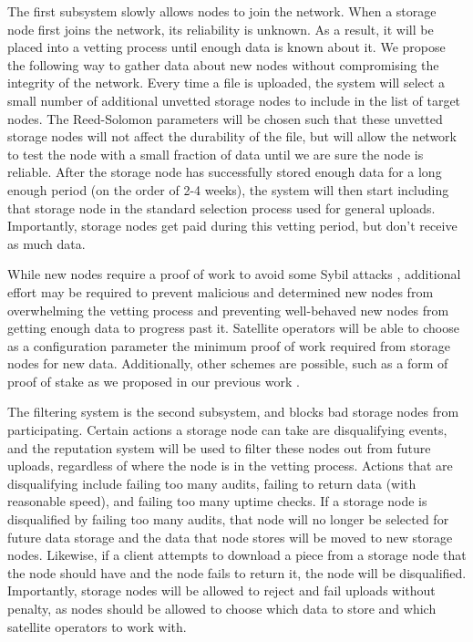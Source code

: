 \documentclass[11pt,fleqn,openany]{book}
\begin{document}
The first subsystem slowly allows nodes to join the network.
When a storage node first joins the network, its reliability is unknown.
As a result, it will be placed into a vetting
process until enough data is known about it.
We propose the following way to gather data about new nodes
without compromising the integrity of the network.
Every time a file is uploaded, the system will select a small number of
additional unvetted storage nodes to include in the list of target nodes.
The Reed-Solomon parameters will be chosen such that these unvetted storage
nodes will not affect the durability of the file, but will allow the network
to test the node
with a small fraction of data until we are sure the node is reliable.
After the storage node has successfully stored enough data for a long enough
period (on the order of 2-4 weeks),
the system will then start including that storage
node in the standard selection process used for general uploads.
Importantly, storage nodes get paid during this
vetting period, but don't receive as much data.

While new nodes require a proof of work to avoid some Sybil attacks
\cite{sybil-attack}, additional effort may be required to prevent
malicious and determined new nodes from overwhelming the vetting process and
preventing well-behaved new nodes from getting enough data to progress past it.
Satellite operators will be able to choose as a configuration
parameter the minimum proof of work required from storage nodes for new data.
Additionally, other schemes are possible, such as a form of proof of stake as
we proposed in our previous work \cite{sybil-cost}.

The filtering system is the second subsystem, and blocks bad storage nodes from
participating.
Certain actions a storage node can take are disqualifying events, and the
reputation system will be used to filter these nodes out from future uploads,
regardless of where the node is in the vetting process.
Actions that are disqualifying include failing too many audits,
failing to return data (with reasonable speed), and failing too many uptime
checks.
If a storage node is disqualified by failing too many audits, that node will no
longer be selected for future data storage and the data that node stores will
be moved to new storage nodes.
Likewise, if a client attempts to download a piece from a storage node that
the node should have and the node fails to return it, the
node will be disqualified. Importantly, storage nodes will be allowed to reject
and fail uploads without penalty, as nodes should be allowed to choose which
data to store and which satellite operators to work with.
\end{document}
